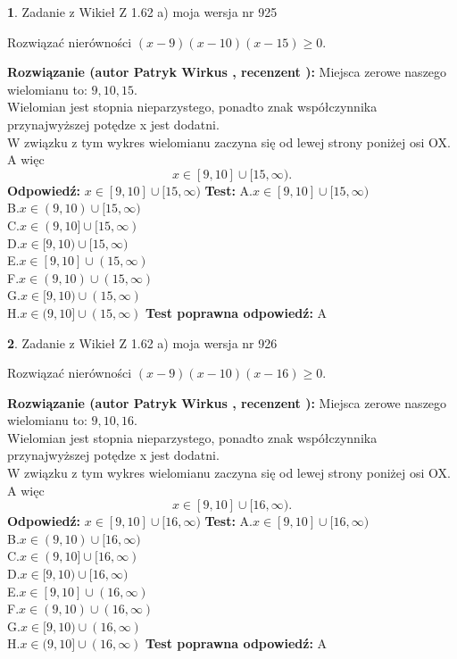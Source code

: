 \documentclass[12pt, a4paper]{article}
\theoremstyle{definition} %
\newtheorem{zad}{}
\newcommand{\zadStart}[1]{\begin{zad}#1\newline}
\newcommand{\zadStop}{\end{zad}}
\newcommand{\rozwStart}[2]{\noindent \textbf{Rozwiązanie (autor #1 , recenzent #2): }\newline}
\newcommand{\rozwStop}{\newline}
\newcommand{\odpStart}{\noindent \textbf{Odpowiedź:}\newline}
\newcommand{\odpStop}{\newline}
\newcommand{\testStart}{\noindent \textbf{Test:}\newline}
\newcommand{\testStop}{\newline}
\newcommand{\kluczStart}{\noindent \textbf{Test poprawna odpowiedź:}\newline}
\newcommand{\kluczStop}{\newline}
\begin{document}
\zadStart{Zadanie z Wikieł Z 1.62 a) moja wersja nr 925}

Rozwiązać nierówności $(x-9)(x-10)(x-15)\ge0$.
\zadStop
\rozwStart{Patryk Wirkus}{}
Miejsca zerowe naszego wielomianu to: $9, 10, 15$.\\
Wielomian jest stopnia nieparzystego, ponadto znak współczynnika przy\linebreak najwyższej potędze x jest dodatni.\\ W związku z tym wykres wielomianu zaczyna się od lewej strony poniżej osi OX. A więc $$x \in [9,10] \cup [15,\infty).$$
\rozwStop
\odpStart
$x \in [9,10] \cup [15,\infty)$
\odpStop
\testStart
A.$x \in [9,10] \cup [15,\infty)$\\
B.$x \in (9,10) \cup [15,\infty)$\\
C.$x \in (9,10] \cup [15,\infty)$\\
D.$x \in [9,10) \cup [15,\infty)$\\
E.$x \in [9,10] \cup (15,\infty)$\\
F.$x \in (9,10) \cup (15,\infty)$\\
G.$x \in [9,10) \cup (15,\infty)$\\
H.$x \in (9,10] \cup (15,\infty)$
\testStop
\kluczStart
A
\kluczStop



\zadStart{Zadanie z Wikieł Z 1.62 a) moja wersja nr 926}

Rozwiązać nierówności $(x-9)(x-10)(x-16)\ge0$.
\zadStop
\rozwStart{Patryk Wirkus}{}
Miejsca zerowe naszego wielomianu to: $9, 10, 16$.\\
Wielomian jest stopnia nieparzystego, ponadto znak współczynnika przy\linebreak najwyższej potędze x jest dodatni.\\ W związku z tym wykres wielomianu zaczyna się od lewej strony poniżej osi OX. A więc $$x \in [9,10] \cup [16,\infty).$$
\rozwStop
\odpStart
$x \in [9,10] \cup [16,\infty)$
\odpStop
\testStart
A.$x \in [9,10] \cup [16,\infty)$\\
B.$x \in (9,10) \cup [16,\infty)$\\
C.$x \in (9,10] \cup [16,\infty)$\\
D.$x \in [9,10) \cup [16,\infty)$\\
E.$x \in [9,10] \cup (16,\infty)$\\
F.$x \in (9,10) \cup (16,\infty)$\\
G.$x \in [9,10) \cup (16,\infty)$\\
H.$x \in (9,10] \cup (16,\infty)$
\testStop
\kluczStart
A
\kluczStop
\end{document}
